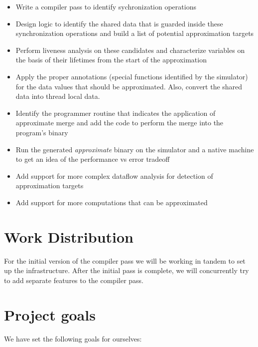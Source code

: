 \documentclass[12pt,conference]{IEEEtran}
\begin{document}
\begin{itemize}

\item Write a compiler pass to identify sychronization operations
\item Design logic to identify the shared data that is guarded inside
these synchronization operations and build a list of potential approximation
targets
\item Perform liveness analysis on these candidates and characterize 
variables on the basis of their lifetimes from the start of the approximation
\item Apply the proper annotations (special functions identified by the simulator)
for the data values that should be approximated. Also, convert the shared data
into thread local data.
\item Identify the programmer routine that indicates the application of 
approximate merge and add the code to perform the merge into the program's binary
\item Run the generated \emph{approximate} binary on the simulator and a native machine to get 
an idea of the performance vs error tradeoff
\item Add support for more complex dataflow analysis for detection 
of approximation targets
\item Add support for more computations that can be approximated

\end{itemize}

\section{Work Distribution}

For the initial version of the compiler pass we will be working in tandem to 
set up the infrastructure. After the initial pass is complete, we will
concurrently try to add separate features to the compiler pass.

\section{Project goals}

We have set the following goals for ourselves:
\end{document}
